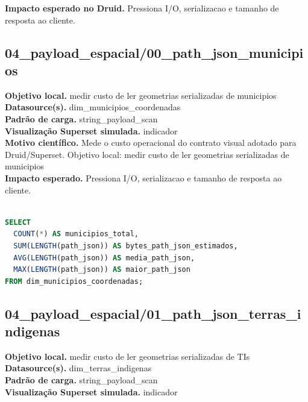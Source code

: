 \documentclass[11pt,a4paper]{article}
\begin{document}
\textbf{Impacto esperado no Druid.} Pressiona I/O, serializacao e tamanho de resposta ao cliente.

\subsection{04\_payload\_espacial/00\_path\_json\_municipios}

\textbf{Objetivo local.} medir custo de ler geometrias serializadas de municipios\\

\textbf{Datasource(s).} dim\_municipios\_coordenadas\\

\textbf{Padrão de carga.} string\_payload\_scan\\

\textbf{Visualização Superset simulada.} indicador\\

\textbf{Motivo científico.} Mede o custo operacional do contrato visual adotado para Druid/Superset. Objetivo local: medir custo de ler geometrias serializadas de municipios\\

\textbf{Impacto esperado.} Pressiona I/O, serializacao e tamanho de resposta ao cliente.

\begin{lstlisting}[language=SQL]

SELECT
  COUNT(*) AS municipios_total,
  SUM(LENGTH(path_json)) AS bytes_path_json_estimados,
  AVG(LENGTH(path_json)) AS media_path_json,
  MAX(LENGTH(path_json)) AS maior_path_json
FROM dim_municipios_coordenadas;

\end{lstlisting}

\subsection{04\_payload\_espacial/01\_path\_json\_terras\_indigenas}

\textbf{Objetivo local.} medir custo de ler geometrias serializadas de TIs\\

\textbf{Datasource(s).} dim\_terras\_indigenas\\

\textbf{Padrão de carga.} string\_payload\_scan\\

\textbf{Visualização Superset simulada.} indicador\\
\end{document}
